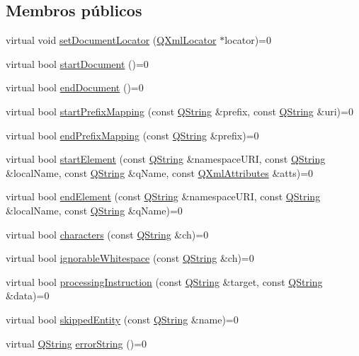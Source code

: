 \subsection*{Membros públicos}
\begin{DoxyCompactItemize}
\item 
virtual void \hyperlink{class_q_xml_content_handler_a02c1b0a6086c5d232ae919bbc5abb740}{set\-Document\-Locator} (\hyperlink{class_q_xml_locator}{Q\-Xml\-Locator} $\ast$locator)=0
\item 
virtual bool \hyperlink{class_q_xml_content_handler_a394d49ec389b7b0024d98698e1ae00cb}{start\-Document} ()=0
\item 
virtual bool \hyperlink{class_q_xml_content_handler_acbf4661637fdf60722444665906d160b}{end\-Document} ()=0
\item 
virtual bool \hyperlink{class_q_xml_content_handler_a3972e8d0c0075489d5fe97402b42980e}{start\-Prefix\-Mapping} (const \hyperlink{class_q_string}{Q\-String} \&prefix, const \hyperlink{class_q_string}{Q\-String} \&uri)=0
\item 
virtual bool \hyperlink{class_q_xml_content_handler_a56e0e8140c661ed6805a09e4d05e9129}{end\-Prefix\-Mapping} (const \hyperlink{class_q_string}{Q\-String} \&prefix)=0
\item 
virtual bool \hyperlink{class_q_xml_content_handler_ac956b69e7f9be94f64e8e90095eb2ce0}{start\-Element} (const \hyperlink{class_q_string}{Q\-String} \&namespace\-U\-R\-I, const \hyperlink{class_q_string}{Q\-String} \&local\-Name, const \hyperlink{class_q_string}{Q\-String} \&q\-Name, const \hyperlink{class_q_xml_attributes}{Q\-Xml\-Attributes} \&atts)=0
\item 
virtual bool \hyperlink{class_q_xml_content_handler_ac85feb837d3634e775cc7c76df84cce0}{end\-Element} (const \hyperlink{class_q_string}{Q\-String} \&namespace\-U\-R\-I, const \hyperlink{class_q_string}{Q\-String} \&local\-Name, const \hyperlink{class_q_string}{Q\-String} \&q\-Name)=0
\item 
virtual bool \hyperlink{class_q_xml_content_handler_a63490f0ac6e8b7794a5ebb331c3a4143}{characters} (const \hyperlink{class_q_string}{Q\-String} \&ch)=0
\item 
virtual bool \hyperlink{class_q_xml_content_handler_aa40e6951e2228aaf528037a98b349ff2}{ignorable\-Whitespace} (const \hyperlink{class_q_string}{Q\-String} \&ch)=0
\item 
virtual bool \hyperlink{class_q_xml_content_handler_a43a2bb5d7a3c1a2fe8eee336bec33dbd}{processing\-Instruction} (const \hyperlink{class_q_string}{Q\-String} \&target, const \hyperlink{class_q_string}{Q\-String} \&data)=0
\item 
virtual bool \hyperlink{class_q_xml_content_handler_a96c291d0d5554a03b2cc445472dd1086}{skipped\-Entity} (const \hyperlink{class_q_string}{Q\-String} \&name)=0
\item 
virtual \hyperlink{class_q_string}{Q\-String} \hyperlink{class_q_xml_content_handler_ac86bbbabef3a52aec7615cbbc0adb3f4}{error\-String} ()=0
\end{DoxyCompactItemize}


